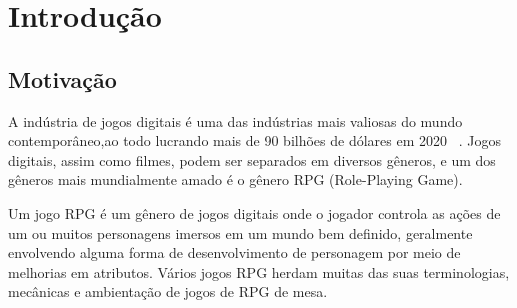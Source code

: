 \documentclass[
	12pt,				%
	openright,			%
	twoside,			%
	a4paper,			%
	english,			%
	french,				%
	spanish,			%
	brazil				%
	]{abntex2}
\begin{document}
\listoftables*
\cleardoublepage
\lstlistoflistings
\cleardoublepage


\tableofcontents*
\cleardoublepage



\textual

\chapter{Introdução}
\section{Motivação}

A indústria de jogos digitais é uma das indústrias mais valiosas do mundo contemporâneo,ao todo lucrando mais de 90 bilhões de dólares em 2020 ~\cite{Techjury}. Jogos digitais, assim como filmes, podem ser separados em diversos gêneros, e um dos gêneros mais mundialmente amado é o gênero RPG (Role-Playing Game).

Um jogo RPG é um gênero de jogos digitais onde o jogador controla as ações de um ou muitos personagens imersos em um mundo bem definido, geralmente envolvendo alguma forma de desenvolvimento de personagem por meio de melhorias em atributos. Vários jogos RPG herdam muitas das suas terminologias, mecânicas e ambientação de jogos de RPG de mesa. ~\cite{Wiki01}
	
\end{document}
